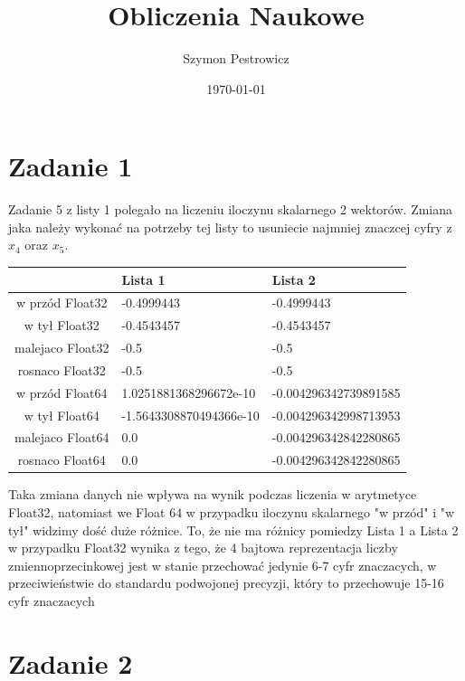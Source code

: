 \documentclass{article} %
\title{Obliczenia Naukowe} %
\author{Szymon Pestrowicz} %
\date{\today} %
\begin{document}
	\maketitle %
	
	\section*{Zadanie 1} %

		Zadanie 5 z listy 1 polegało na liczeniu iloczynu skalarnego 2 wektorów. Zmiana jaka należy wykonać na potrzeby tej listy to usuniecie najmniej znaczcej cyfry z $x_4$ oraz $x_5$.
	    
		\vspace{0.1cm}
		\begin{tabularx}{\textwidth}{|c|X|X|}
		\hline
		 & Lista 1 & Lista 2 \\
		\hline
		w przód Float32 & -0.4999443 & -0.4999443 \\
		\hline
		w tył Float32 & -0.4543457 & -0.4543457 \\
		\hline
		malejaco Float32 & -0.5 & -0.5\\
		\hline
		rosnaco Float32 &  -0.5 & -0.5\\
		\hline
		w przód Float64 & 1.0251881368296672e-10 &-0.004296342739891585\\
		\hline
		w tył Float64 & -1.5643308870494366e-10 &-0.004296342998713953 \\
		\hline
		malejaco Float64 & 0.0 &-0.004296342842280865 \\
		\hline
		rosnaco Float64 & 0.0 &-0.004296342842280865 \\
		\hline
		\end{tabularx}
		\vspace{0.1cm}

		Taka zmiana danych nie wpływa na wynik podczas liczenia w arytmetyce Float32, natomiast we Float 64 w przypadku iloczynu skalarnego "w przód" i "w tył" widzimy dość duże różnice. To, że nie ma różnicy pomiedzy Lista 1 a Lista 2 w przypadku Float32 wynika z tego, że 4 bajtowa reprezentacja liczby zmiennoprzecinkowej jest w stanie przechować jedynie 6-7 cyfr znaczacych, w przeciwieństwie do standardu podwojonej precyzji, który to przechowuje 15-16 cyfr znaczacych

	\section*{Zadanie 2} %
		
\end{document}

